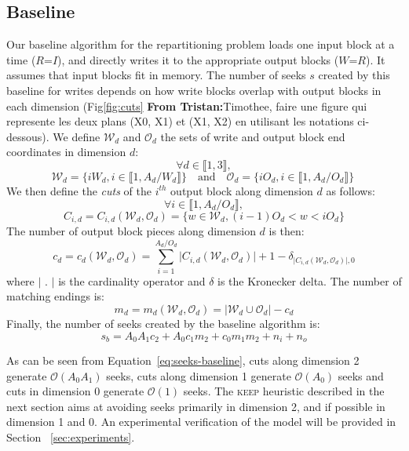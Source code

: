\documentclass[sigconf, nonacm]{acmart}
\newcommand{\tristan}[1]{\color{orange}\textbf{From Tristan:}#1\color{black}}
\newcommand{\keep}[0]{\textsc{keep}\xspace}
\begin{document}
\subsection{Baseline}

Our baseline algorithm for the repartitioning problem loads one input block
at a time ($R$=$I$), and directly writes it to the appropriate output
blocks ($W$=$R$). It assumes that input blocks fit in memory. The number of
seeks $s$ created by this baseline for writes 
depends on how write blocks overlap with
output blocks in each dimension (Fig\ref{fig:cuts} \tristan{Timothee, faire une figure 
qui represente les deux plans (X0, X1) et (X1, X2) en utilisant les notations ci-dessous}). We define
$\mathcal{W}_d$ and $\mathcal{O}_d$ the sets of write and output block end
coordinates in dimension $d$:
\[
  \forall d \in \llbracket 1, 3 \rrbracket,
\]
\begin{equation}
  \mathcal{W}_d = \Big\{ iW_d, i \in \llbracket 1, A_d/W_d \rrbracket \Big\} \quad \mathrm{and} \quad
  \mathcal{O}_d = \Big\{ iO_d, i \in \llbracket 1, A_d/O_d \rrbracket \Big\} ~\label{eq:baseline-blocks}
\end{equation}
We then define the \emph{cuts} of the $i^{th}$ output block along dimension
$d$ as follows:
\[
  \forall i \in \llbracket 1, A_d/O_d \rrbracket,
\]
\[
  C_{i, d} = C_{i, d}\left(  \mathcal{W}_d, \mathcal{O}_d \right) = \Big\{ w \in \mathcal{W}_d, (i-1)O_d < w < iO_d \Big\}
\]
The number of output block pieces along dimension $d$ is then:
\[
  c_d = c_d\left(  \mathcal{W}_d, \mathcal{O}_d \right) =
               \sum_{i=1}^{A_d/O_d} \vert C_{i, d}\left(  \mathcal{W}_d, \mathcal{O}_d \right) \vert + 1 - \delta_{\vert C_{i, d}\left(  \mathcal{W}_d, \mathcal{O}_d \right) \vert, 0}
\]
where $\vert$ . $\vert$ is the cardinality operator and $\delta$ is the Kronecker delta. 
The number of matching endings is:
\[
  m_d = m_d\left(  \mathcal{W}_d, \mathcal{O}_d \right) = \vert \mathcal{W}_d \cup  \mathcal{O}_d \vert  - c_d
  \]
Finally, the number of seeks created by the baseline algorithm is:
\begin{equation}
  s_b = A_0 A_1 c_2 + 
      A_0 c_1 m_2 +
      c_0 m_1 m_2
       + n_i + n_o \label{eq:seeks-baseline}
\end{equation}


As can be seen from Equation~\ref{eq:seeks-baseline}, cuts along dimension 2 generate $\mathcal{O}(A_0 A_1)$
seeks, cuts along dimension 1 generate $\mathcal{O}(A_0)$ seeks and cuts in
dimension 0 generate $\mathcal{O}(1)$ seeks. The \keep heuristic described
in the next section aims at avoiding seeks primarily in dimension 2, and if
possible in dimension 1 and 0. An experimental verification of the model will be provided in 
Section ~\ref{sec:experiments}.
\end{document}
